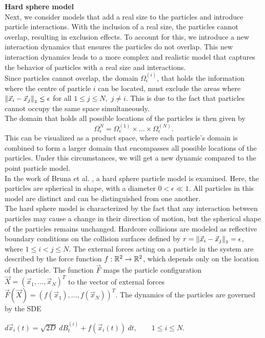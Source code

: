 \textbf{Hard sphere model} \\
Next, we consider models that add a real size to the particles and introduce particle interactions. 
With the inclusion of a real size, the particles cannot overlap, resulting in exclusion effects. 
To account for this, we introduce a new interaction dynamics that ensures the particles do not overlap. 
This new interaction dynamics leads to a more complex and realistic model that captures the behavior of particles with a real size and interactions. \\
Since particles cannot overlap, the domain $\Omega^{(i)}_{\epsilon}$, that holds the information where the centre of particle $i$ can be located, must exclude the areas where $\norm[\vec{x}_i - \vec{x}_j] \leq \epsilon$ for all $1 \leq j \leq N,$ $j \neq i$. 
This is due to the fact that particles cannot occupy the same space simultaneously. \\
The domain that holds all possible locations of the particles is then given by \[\Omega^N_{\epsilon} = \Omega^{(1)}_{\epsilon} \times \ldots \times \Omega^{(N)}_{\epsilon} .\] 
This can be visualized as a product space, where each particle's domain is combined to form a larger domain that encompasses all possible locations of the particles.
Under this circumstances, we will get a new dynamic compared to the point particle model.  \\
In the work of Bruna et al. \cite{Bruna2012}, a hard sphere particle model is examined.
Here, the particles are spherical in shape, with a diameter $0 < \epsilon \ll 1$.
All particles in this model are distinct and can be distinguished from one another. \\
The hard sphere model is characterized by the fact that any interaction between particles may cause a change in their direction of motion, but the spherical shape of the particles remains unchanged.
Hardcore collisions are modeled as reflective boundary conditions on the collision surfaces defined by $r = \norm[\vec{x}_i - \vec{x}_j] = \epsilon$, where $1 \leq i < j \leq N$.
The external forces acting on a particle in the system are described by the force function $f: \mathbb{R}^2 \rightarrow \mathbb{R}^2$, which depends only on the location of the particle.
The function $\vec{F}$ maps the particle configuration $\vec{X} = (\vec{x}_1, \ldots, \vec{x}_N)^T$ to the vector of external forces $\vec{F}(\vec{X}) = (f(\vec{x}_1), \ldots, f(\vec{x}_N))^T$.
The dynamics of the particles are governed by the SDE
\begin{center}
	$d\vec{x}_i(t) = \sqrt{2D} \: dB_t^{(i)} + f(\vec{x}_i(t)) \: dt, \qquad 1 \leq i \leq N$.
\end{center}
